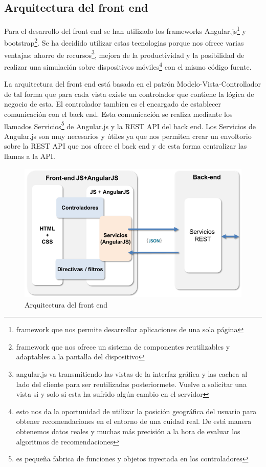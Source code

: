 \subsection{Arquitectura del front end}
\thispagestyle{empty}

Para el desarrollo del front end se han utilizado los frameworks Angular.js\footnote{framework que nos permite desarrollar aplicaciones de una sola página} y bootstrap\footnote{framework que nos ofrece un sistema de componentes reutilizables y adaptables a la pantalla del dispositivo}. Se ha decidido utilizar estas tecnologias porque nos ofrece varias ventajas: ahorro de recursos\footnote{angular.js va transmitiendo las vistas de la interfaz gráfica y las cachea al lado del cliente para ser reutilizadas posteriormete. Vuelve a solicitar una vista si y solo si esta ha sufrido algún cambio en el servidor}, mejora de la productividad y la posibilidad de realizar una simulación sobre dispositivos móviles\footnote{esto nos da la oportunidad de utilizar la posición geográfica del usuario para obtener recomendaciones en el entorno de una cuidad real. De está manera obtenemos datos reales y muchas más precisión a la hora de evaluar los algoritmos de recomendaciones} con el mismo código fuente.

La arquitectura del front end está basada en el patrón Modelo-Vista-Controllador de tal forma que para cada vista existe un controlador que contiene la lógica de negocio de esta. El controlador tambien es el encargado de establecer comunicación con el back end. Esta comunicación se realiza mediante los llamados Servicios\footnote{es pequeña fabrica de funciones y objetos inyectada en los controladores} de Angular.js y la REST API del back end. Los Servicios de Angular.js son muy necesarios y útiles ya que nos permiten crear un envoltorio sobre la REST API que nos ofrece el back end y de esta forma centralizar las llamas a la API.

\begin{figure}[H]
\centering\includegraphics[scale=0.6]{imagenes/arquitectura-front-end.png}
\caption{Arquitectura del front end}
\label{arquitecturaFrontEnd}
\end{figure}

